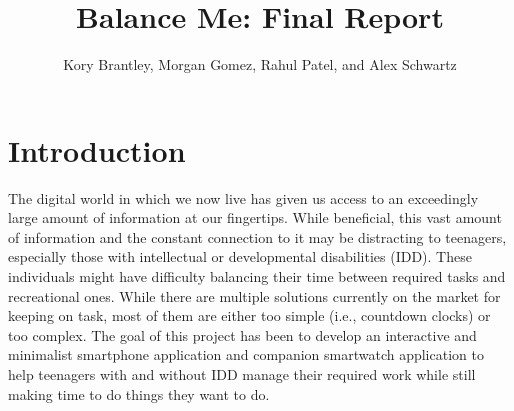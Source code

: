 \documentclass{sigchi}
\def\plaintitle{Balance Me: Final Report}
\def\plainauthor{Kory Brantley, Morgan Gomez, Rahul Patel,
and Alex Schwartz}
\begin{document}
\title{\plaintitle}

\author{
\plainauthor
}

\newenvironment{myitemize}
{ \begin{itemize}
    \setlength{\itemsep}{0pt}
    \setlength{\parskip}{0pt}
    \setlength{\parsep}{0pt}     }
{ \end{itemize}                  } 

\maketitle

\section{Introduction}

The digital world in which we now live has given us access to an exceedingly
large amount of information at our fingertips. While beneficial, this vast
amount of information and the constant connection to it may be distracting to
teenagers, especially those with intellectual or developmental disabilities
(IDD). These individuals might have difficulty balancing their time between
required tasks and recreational ones. While there are multiple solutions
currently on the market for keeping on task, most of them are either too simple
(i.e., countdown clocks) or too complex. The goal of this project has been to
develop an interactive and minimalist smartphone application and companion
smartwatch application to help teenagers with and without IDD manage their
required work while still making time to do things they want to do.
\end{document}
